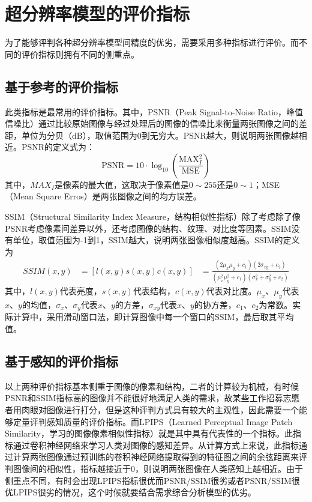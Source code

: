 \section{超分辨率模型的评价指标}
为了能够评判各种超分辨率模型间精度的优劣，需要采用多种指标进行评价。而不同的评价指标则拥有不同的侧重点。
\subsection{基于参考的评价指标}
此类指标是最常用的评价指标。其中，PSNR（Peak Signal-to-Noise Ratio，峰值信噪比）通过比较原始图像与经过处理后的图像的信噪比来衡量两张图像之间的差距，单位为分贝（dB），取值范围为0到无穷大。PSNR越大，则说明两张图像越相近。PSNR的定义式为：
\begin{equation}
    \text{PSNR}=10\cdot \log_{10}(\frac{\text{MAX}_I^2}{\text{MSE}})
\end{equation}
其中，$MAX_I$是像素的最大值，这取决于像素值是$0\sim 255$还是$0\sim 1$；MSE（Mean Square Erros）是两张图像之间的均方误差。

SSIM\parencite{wang2002universal}（Structural Similarity Index Measure，结构相似性指标）除了考虑除了像PSNR考虑像素间差异以外，还考虑图像的结构、纹理、对比度等因素。SSIM没有单位，取值范围为-1到1，SSIM越大，说明两张图像相似度越高。SSIM的定义为
\begin{equation}
    \begin{aligned}
        SSIM(x,y)&=[l(x,y)s(x,y)c(x,y)]
                 &=\frac{(2\mu_x\mu_y+c_1)(2\sigma_{xy}+c_2)}{(\mu_x^2\mu_y^2+c_1)(\sigma_x^2+\sigma_y^2+c_2)}
    \end{aligned}
\end{equation}
其中，$l(x,y)$代表亮度，$s(x,y)$代表结构，$c(x,y)$代表对比度。$\mu_x$、$\mu_y$代表$x、y$的均值，$\sigma_x$、$\sigma_y$代表$x、y$的方差，$\sigma_{xy}$代表$x、y$的协方差，$c_1$、$c_2$为常数。实际计算中，采用滑动窗口法，即计算图像中每一个窗口的SSIM，最后取其平均值。

\subsection{基于感知的评价指标}
以上两种评价指标基本侧重于图像的像素和结构，二者的计算较为机械，有时候PSNR和SSIM指标高的图像并不能很好地满足人类的需求，故某些工作招募志愿者用肉眼对图像进行打分，但是这种评判方式具有较大的主观性，因此需要一个能够定量评判感知质量的评价指标。而LPIPS\parencite{zhang2018perceptual}（Learned Perceptual Image Patch Similarity，学习的图像像素相似性指标）就是其中具有代表性的一个指标。此指标通过卷积神经网络来学习人类对图像的感知差异。从计算方式上来说，此指标通过计算两张图像通过预训练的卷积神经网络提取得到的特征图之间的余弦距离来评判图像间的相似性，指标越接近于0，则说明两张图像在人类感知上越相近。由于侧重点不同，有时会出现LPIPS指标很优而PSNR/SSIM很劣或者PSNR/SSIM很优LPIPS很劣的情况，这个时候就要结合需求综合分析模型的优劣。

